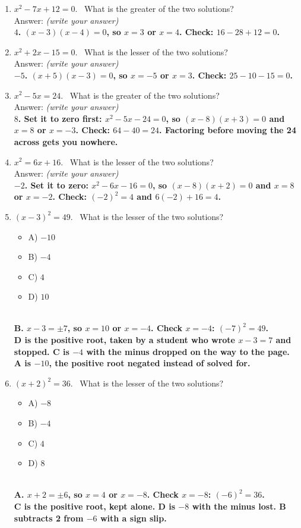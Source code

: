 \documentclass[11pt,a4paper]{article}
\newcommand{\spr}{\\[3pt]\hspace*{6pt}Answer: \underline{\hspace{3.2cm}}\hfill{\footnotesize\itshape(write your answer)}}
\newcommand{\ans}[1]{\ {\color{keyred}\bfseries #1}}
\newcommand{\ans}[1]{}
\newenvironment{choices}
  {\par\nopagebreak\begin{itemize}[label={},leftmargin=16pt,itemsep=0pt,topsep=2pt,parsep=0pt,%
     beginpenalty=10000,midpenalty=10000]}
  {\end{itemize}}
\begin{document}
\begin{enumerate}[leftmargin=20pt,itemsep=9pt]
\item $x^2-7x+12=0$. \ What is the greater of the two solutions? \spr
  \ans{\\ $4$. $(x-3)(x-4)=0$, so $x=3$ or $x=4$. Check: $16-28+12=0$.}

\item $x^2+2x-15=0$. \ What is the lesser of the two solutions? \spr
  \ans{\\ $-5$. $(x+5)(x-3)=0$, so $x=-5$ or $x=3$. Check: $25-10-15=0$.}

\item $x^2-5x=24$. \ What is the greater of the two solutions? \spr
  \ans{\\ $8$. Set it to zero first: $x^2-5x-24=0$, so $(x-8)(x+3)=0$ and $x=8$ or $x=-3$. Check: $64-40=24$. Factoring before moving the 24 across gets you nowhere.}

\item $x^2=6x+16$. \ What is the lesser of the two solutions? \spr
  \ans{\\ $-2$. Set it to zero: $x^2-6x-16=0$, so $(x-8)(x+2)=0$ and $x=8$ or $x=-2$. Check: $(-2)^2=4$ and $6(-2)+16=4$.}

\item $(x-3)^2=49$. \ What is the lesser of the two solutions?
  \begin{choices}
  \item A) $-10$
  \item B) $-4$
  \item C) $4$
  \item D) $10$
  \end{choices}
  \ans{\\ B. $x-3=\pm7$, so $x=10$ or $x=-4$. Check $x=-4$: $(-7)^2=49$. \\ D is the positive root, taken by a student who wrote $x-3=7$ and stopped. C is $-4$ with the minus dropped on the way to the page. A is $-10$, the positive root negated instead of solved for.}

\item $(x+2)^2=36$. \ What is the lesser of the two solutions?
  \begin{choices}
  \item A) $-8$
  \item B) $-4$
  \item C) $4$
  \item D) $8$
  \end{choices}
  \ans{\\ A. $x+2=\pm6$, so $x=4$ or $x=-8$. Check $x=-8$: $(-6)^2=36$. \\ C is the positive root, kept alone. D is $-8$ with the minus lost. B subtracts 2 from $-6$ with a sign slip.}


\end{enumerate}
\end{document}
